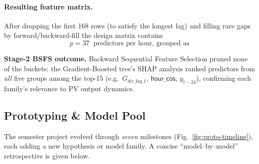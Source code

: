\paragraph{Resulting feature matrix.}
After dropping the first 168 rows (to satisfy the longest lag) and filling
rare gaps by forward/backward‐fill the design matrix contains
\[
p = 37 \;\; \text{predictors per hour, grouped as}
\]

\medskip
\noindent
\textbf{Stage-2 BSFS outcome.}  
Backward Sequential Feature Selection pruned none of the buckets: the
Gradient-Boosted tree’s SHAP analysis ranked predictors from \emph{all}
five groups among the top-15 (e.g.\ $G_{dir\_lag\_1}$, $\textsf{hour\_cos}$,
$y_{t-24}$), confirming each family’s relevance to PV output dynamics.

\subsection{Prototyping \& Model Pool}
\label{subsec:model-pool}

The semester project evolved through \emph{seven} milestones
(Fig.~\ref{fig:proto-timeline}), each adding a new hypothesis or model
family.  A concise ``model–by–model'' retrospective is given below.

